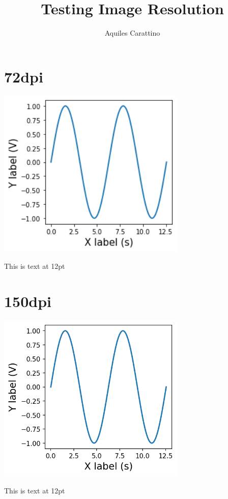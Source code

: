 \documentclass[12pt,a4paper]{article}
\author{Aquiles Carattino}
\title{Testing Image Resolution}
\begin{document}
\section*{72dpi}
\begin{center}
\includegraphics[width=3.54in]{72dpi.png}
\end{center}
This is text at 12pt
\section*{150dpi}
\begin{center}
\includegraphics[width=3.54in]{150dpi.png}
\end{center}
This is text at 12pt
\end{document}
